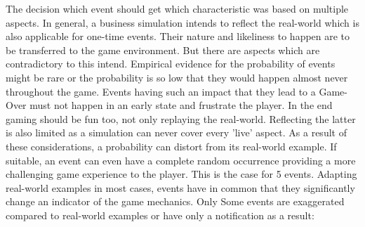 \documentclass[11pt,titlepage,oneside,openany]{book}
\begin{document}
The decision which event should get which characteristic was based on multiple aspects. In general, a business simulation intends to reflect the real-world which is also applicable for one-time events. Their nature and likeliness to happen are to be transferred to the game environment. But there are aspects which are contradictory to this intend. Empirical evidence for the probability of events might be rare or the probability is so low that they would happen almost never throughout the game. Events having such an impact that they lead to a Game-Over must not happen in an early state and frustrate the player. In the end gaming should be fun too, not only replaying the real-world. Reflecting the latter is also limited as a simulation can never cover every 'live' aspect. As a result of these considerations, a probability can distort from its real-world example. If suitable, an event can even have a complete random occurrence providing a more challenging game experience to the player. This is the case for 5 events. Adapting real-world examples in most cases, events have in common that they significantly change an indicator of the game mechanics. Only Some events are exaggerated compared to real-world examples or have only a notification as a result:
\end{document}
